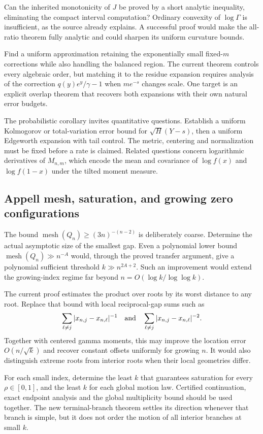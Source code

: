 Can the inherited monotonicity of $J$ be proved by a short analytic
inequality, eliminating the compact interval computation? Ordinary
convexity of $\log\Gamma$ is insufficient, as the source already explains.
A successful proof would make the all-ratio theorem fully analytic and
could sharpen its uniform curvature bounds.

Find a uniform approximation retaining the exponentially small
fixed-$m$ corrections while also handling the balanced region. The
current theorem controls every algebraic order, but matching it to the
residue expansion requires analysis of the correction
$q(y)e^y/\gamma-1$ when $m e^{-s}$ changes scale. One target is an
explicit overlap theorem that recovers both expansions with their own
natural error budgets.

The probabilistic corollary invites quantitative questions. Establish a
uniform Kolmogorov or total-variation error bound for
$\sqrt H(Y-s)$, then a uniform Edgeworth expansion with tail control.
The metric, centering and normalization must be fixed before a rate is
claimed. Related questions concern logarithmic derivatives of $M_{n,m}$,
which encode the mean and covariance of $\log f(x)$ and $\log f(1-x)$
under the tilted moment measure.

\subsection{Appell mesh, saturation, and growing zero configurations}

The bound $\operatorname{mesh}(Q_n)\ge(3n)^{-(n-2)}$ is deliberately
coarse. Determine the actual asymptotic size of the smallest gap. Even a
polynomial lower bound $\operatorname{mesh}(Q_n)\gg n^{-A}$ would, through
the proved transfer argument, give a polynomial sufficient threshold
$k\gg n^{2A+2}$. Such an improvement would extend the growing-index regime
far beyond $n=O(\log k/\log\log k)$.

The current proof estimates the product over roots by its worst distance
to any root. Replace that bound with local reciprocal-gap sums such as
\[
 \sum_{\ell\ne j}|x_{n,j}-x_{n,\ell}|^{-1}
 \quad\hbox{and}\quad
 \sum_{\ell\ne j}|x_{n,j}-x_{n,\ell}|^{-2}.
\]
Together with centered gamma moments, this may improve the location
error $O(n/\sqrt{k})$ and recover constant offsets uniformly for growing
$n$. It would also distinguish extreme roots from interior roots when
their local geometries differ.

For each small index, determine the least $k$ that guarantees saturation
for every $\rho\in[0,1]$, and the least $k$ for each global motion law.
Certified continuation, exact endpoint analysis and the global
multiplicity bound should be used together. The new terminal-branch
theorem settles its direction whenever that branch is simple, but it
does not order the motion of all interior branches at small $k$.


